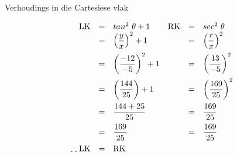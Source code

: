 \begin{wex}{Verhoudings in die Cartesiese vlak}
{
\begin{equation*}
\begin{array}{rclrcl}
 \hfill \mbox{LK} &=&  tan^{2}~\theta + 1 	&	\mbox{RK}	&=&  	sec^{2}~\theta \hfill \\
\hfill &=& \left(\dfrac{y}{x}\right)^{2} + 1  	&	&=&  \left(\dfrac{r}{x}\right)^{2} \hfill \vspace{5pt} \\
\hfill&=&  \left(\dfrac{-12}{-5}\right)^{2} + 1 	&	&=&  \left(\dfrac{13}{-5}\right)^{2} \hfill \vspace{5pt}\\
\hfill&=&  \left (\dfrac{144}{25}\right) + 1  	&	&=&  \left(\dfrac{169}{25}\right)^{2} \hfill \vspace{5pt}\\
\hfill &=& \dfrac{144 + 25}{25} 		&	&=&  \dfrac{169}{25} \hfill \vspace{5pt}\\
\hfill &=& \dfrac{169}{25}  			&	&=&  \dfrac{169}{25} \hfill \vspace{5pt}\\
\hfill \therefore \mbox{LK} &=& \mbox{RK}&& \hfill

\end{array}
\end{equation*}

}
\end{wex}



